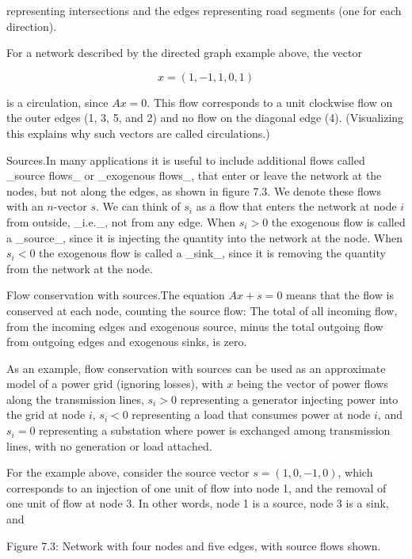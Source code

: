 representing intersections and the edges representing road segments (one for each direction).

For a network described by the directed graph example above, the vector

\[x=(1,-1,1,0,1)\]

is a circulation, since \(Ax=0\). This flow corresponds to a unit clockwise flow on the outer edges (1, 3, 5, and 2) and no flow on the diagonal edge (4). (Visualizing this explains why such vectors are called circulations.)

Sources.In many applications it is useful to include additional flows called _source flows_ or _exogenous flows_, that enter or leave the network at the nodes, but not along the edges, as shown in figure 7.3. We denote these flows with an \(n\)-vector \(s\). We can think of \(s_{i}\) as a flow that enters the network at node \(i\) from outside, _i.e._, not from any edge. When \(s_{i}>0\) the exogenous flow is called a _source_, since it is injecting the quantity into the network at the node. When \(s_{i}<0\) the exogenous flow is called a _sink_, since it is removing the quantity from the network at the node.

Flow conservation with sources.The equation \(Ax+s=0\) means that the flow is conserved at each node, counting the source flow: The total of all incoming flow, from the incoming edges and exogenous source, minus the total outgoing flow from outgoing edges and exogenous sinks, is zero.

As an example, flow conservation with sources can be used as an approximate model of a power grid (ignoring losses), with \(x\) being the vector of power flows along the transmission lines, \(s_{i}>0\) representing a generator injecting power into the grid at node \(i\), \(s_{i}<0\) representing a load that consumes power at node \(i\), and \(s_{i}=0\) representing a substation where power is exchanged among transmission lines, with no generation or load attached.

For the example above, consider the source vector \(s=(1,0,-1,0)\), which corresponds to an injection of one unit of flow into node 1, and the removal of one unit of flow at node 3. In other words, node 1 is a source, node 3 is a sink, and

Figure 7.3: Network with four nodes and five edges, with source flows shown.

 